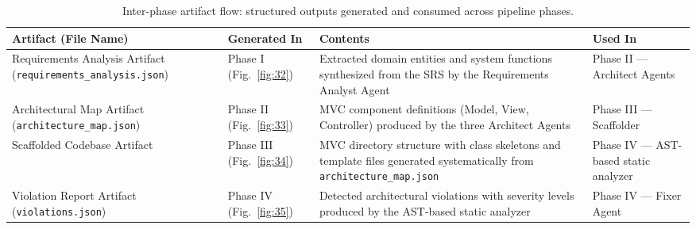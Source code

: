 \begin{table}[pos=h]
\centering
\caption{Inter-phase artifact flow: structured outputs generated and consumed across pipeline phases.}
\label{tab:artifact_flow}
\renewcommand{\arraystretch}{1.3}
\begin{tabularx}{\textwidth}{@{} >{\raggedright\arraybackslash}X l >{\raggedright\arraybackslash}X >{\raggedright\arraybackslash}X @{}}
\toprule
\textbf{Artifact (File Name)} & \textbf{Generated In} & \textbf{Contents} & \textbf{Used In} \\
\midrule
Requirements Analysis Artifact \newline (\texttt{requirements\_analysis.json}) & Phase I (Fig.~\ref{fig:32}) & Extracted domain entities and system functions synthesized from the SRS by the Requirements Analyst Agent & Phase II --- Architect Agents \\
\midrule
Architectural Map Artifact \newline (\texttt{architecture\_map.json}) & Phase II (Fig.~\ref{fig:33}) & MVC component definitions (Model, View, Controller) produced by the three Architect Agents & Phase III --- Scaffolder \\
\midrule
Scaffolded Codebase Artifact & Phase III (Fig.~\ref{fig:34}) & MVC directory structure with class skeletons and template files generated systematically from \texttt{architecture\_map.json} & Phase IV --- AST-based static analyzer \\
\midrule
Violation Report Artifact \newline (\texttt{violations.json}) & Phase IV (Fig.~\ref{fig:35}) & Detected architectural violations with severity levels produced by the AST-based static analyzer & Phase IV --- Fixer Agent \\
\bottomrule
\end{tabularx}
\end{table}